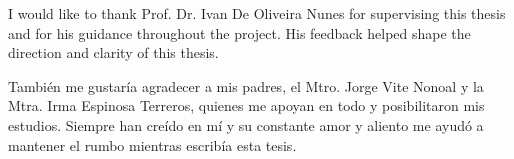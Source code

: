 \begin{acknowledgements}
\vspace*{1.5cm}
\begin{large}
I would like to thank Prof. Dr. Ivan De Oliveira Nunes for supervising this thesis and for his guidance throughout the project. His feedback helped shape the direction and clarity of this thesis.

\vspace{0.8cm}

También me gustaría agradecer a mis padres, el Mtro. Jorge Vite Nonoal y la Mtra. Irma Espinosa Terreros, quienes me apoyan en todo y posibilitaron mis estudios. Siempre han creído en mí y su constante amor y aliento me ayudó a mantener el rumbo mientras escribía esta tesis.
\end{large}
\end{acknowledgements}
